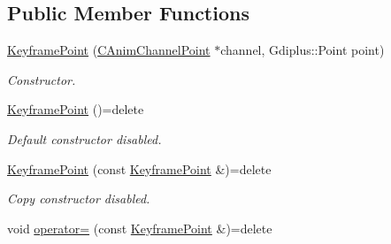 \subsection*{Public Member Functions}
\begin{DoxyCompactItemize}
\item 
\hyperlink{class_c_anim_channel_point_1_1_keyframe_point_af85af782373e964e25ca7238170c927e}{Keyframe\+Point} (\hyperlink{class_c_anim_channel_point}{C\+Anim\+Channel\+Point} $\ast$channel, Gdiplus\+::\+Point point)
\begin{DoxyCompactList}\small\item\em Constructor. \end{DoxyCompactList}\item 
\hypertarget{class_c_anim_channel_point_1_1_keyframe_point_a62d4675ea40bfba7911404dda2ec5065}{\hyperlink{class_c_anim_channel_point_1_1_keyframe_point_a62d4675ea40bfba7911404dda2ec5065}{Keyframe\+Point} ()=delete}\label{class_c_anim_channel_point_1_1_keyframe_point_a62d4675ea40bfba7911404dda2ec5065}

\begin{DoxyCompactList}\small\item\em Default constructor disabled. \end{DoxyCompactList}\item 
\hypertarget{class_c_anim_channel_point_1_1_keyframe_point_abf2e4236b5f8dd0c57cf61dd258bfc6f}{\hyperlink{class_c_anim_channel_point_1_1_keyframe_point_abf2e4236b5f8dd0c57cf61dd258bfc6f}{Keyframe\+Point} (const \hyperlink{class_c_anim_channel_point_1_1_keyframe_point}{Keyframe\+Point} \&)=delete}\label{class_c_anim_channel_point_1_1_keyframe_point_abf2e4236b5f8dd0c57cf61dd258bfc6f}

\begin{DoxyCompactList}\small\item\em Copy constructor disabled. \end{DoxyCompactList}\item 
\hypertarget{class_c_anim_channel_point_1_1_keyframe_point_a7d54b4fb38136049f4d7fea3c12dc5f2}{void \hyperlink{class_c_anim_channel_point_1_1_keyframe_point_a7d54b4fb38136049f4d7fea3c12dc5f2}{operator=} (const \hyperlink{class_c_anim_channel_point_1_1_keyframe_point}{Keyframe\+Point} \&)=delete}\label{class_c_anim_channel_point_1_1_keyframe_point_a7d54b4fb38136049f4d7fea3c12dc5f2}


\end{DoxyCompactItemize}
